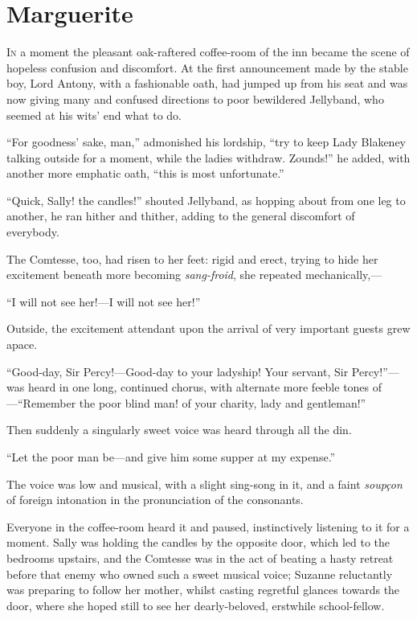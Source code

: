 
\chapter{Marguerite}
\lettrine[lines=4]{I}{n} a moment the pleasant oak-raftered coffee-room of the inn became the scene of hopeless confusion and discomfort. At the first announcement made by the stable boy, Lord Antony, with a fashionable oath, had jumped up from his seat and was now giving many and confused directions to poor bewildered Jellyband, who seemed at his wits’ end what to do.

\enquote{For goodness’ sake, man,} admonished his lordship, \enquote{try to keep Lady Blakeney talking outside for a moment, while the ladies withdraw. Zounds!} he added, with another more emphatic oath, \enquote{this is most unfortunate.}

\enquote{Quick, Sally! the candles!} shouted Jellyband, as hopping about from one leg to another, he ran hither and thither, adding to the general discomfort of everybody.

The Comtesse, too, had risen to her feet: rigid and erect, trying to hide her excitement beneath more becoming \textit{sang-froid}, she repeated mechanically,---

\enquote{I will not see her!---I will not see her!}

Outside, the excitement attendant upon the arrival of very important guests grew apace.

\enquote{Good-day, Sir Percy!---Good-day to your ladyship! Your servant, Sir Percy!}---was heard in one long, continued chorus, with alternate more feeble tones of---\enquote{Remember the poor blind man! of your charity, lady and gentleman!}

Then suddenly a singularly sweet voice was heard through all the din.

\enquote{Let the poor man be---and give him some supper at my expense.}

The voice was low and musical, with a slight sing-song in it, and a faint \textit{soupçon} of foreign intonation in the pronunciation of the consonants.

Everyone in the coffee-room heard it and paused, instinctively listening to it for a moment. Sally was holding the candles by the opposite door, which led to the bedrooms upstairs, and the Comtesse was in the act of beating a hasty retreat before that enemy who owned such a sweet musical voice; Suzanne reluctantly was preparing to follow her mother, whilst casting regretful glances towards the door, where she hoped still to see her dearly-beloved, erstwhile school-fellow.

